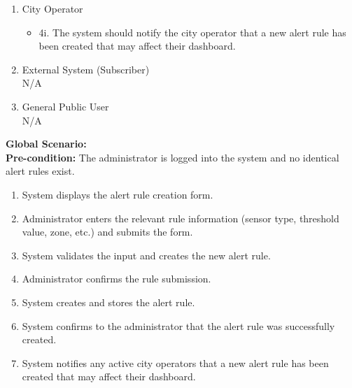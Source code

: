 {\begin{enumerate}[{\bf BE1.}]
\begin{enumerate}[{\bf VP1.}]
		\item City Operator
		     \begin{itemize}
				\item[] {4i.} The system should notify the city operator that a new alert rule has been created that may affect their dashboard.
			 \end{itemize}
		\item External System (Subscriber) \\ N/A
		\item General Public User \\ N/A
	\end{enumerate}
	{\bf Global Scenario:} \\
	{\bf Pre-condition:} The administrator is logged into the system and no identical alert rules exist.
		\begin{enumerate}[1. ]
			\item System displays the alert rule creation form.
            \item Administrator enters the relevant rule information (sensor type, threshold value, zone, etc.) and submits the form.
            \item System validates the input and creates the new alert rule.
            \item Administrator confirms the rule submission.
            \item System creates and stores the alert rule.
            \item System confirms to the administrator that the alert rule was successfully created.
            \item System notifies any active city operators that a new alert rule has been created that may affect their dashboard.
		\end{enumerate}


\end{enumerate}}
